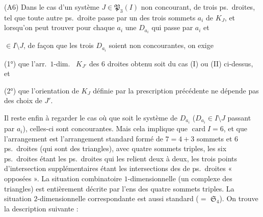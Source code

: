 \documentclass[11pt,a4paper]{article}
\begin{document}
(A6)  Dans le cas d'un système $J \in \mathfrak{P}_3(I)$ non concourant, de trois ps.\ droites, tel que toute autre ps.\ droite passe par un des trois sommets $a_i$ de $K_J$, et lorsqu'on peut trouver pour chaque $a_i$ une $D_{a_i}$ qui passe par $a_i$ et

 $\in I \setminus J$, de façon que les trois $D_{a_i}$ soient non concourantes, on exige

(1°) que l'arr.\ $1$-dim.\  $K_{J'}$ des $6$ droites obtenu soit du cas (I) ou (II) ci-dessus, et

(2°) que l'orientation de $K_J$ définie par la prescription précédente ne dépende pas des choix de $J'$.

Il reste enfin à regarder le cas où  que soit le système de $D_{a_i}$ ($D_{a_i} \in I \setminus J$ passant par $a_i$), celles-ci sont concourantes. Mais cela implique que  $\operatorname{card} I = 6$, et que l'arrangement est  l'arrangement standard formé de $7 = 4 + 3$ sommets et $6$ ps.\ droites (qui sont des triangles), avec quatre sommets triples, les six ps.\ droites étant les ps.\ droites qui les relient deux à deux, les trois points d'intersection supplémentaires étant les intersections des  de ps.\ droites « opposées ». La situation combinatoire $1$-dimensionnelle (un complexe \ill{} des triangles) est entièrement décrite par l'ens des quatre sommets triples. La situation $2$-dimensionnelle correspondante est aussi standard ($=$  $\mathfrak{S}_4$). On trouve la description suivante :
\end{document}
